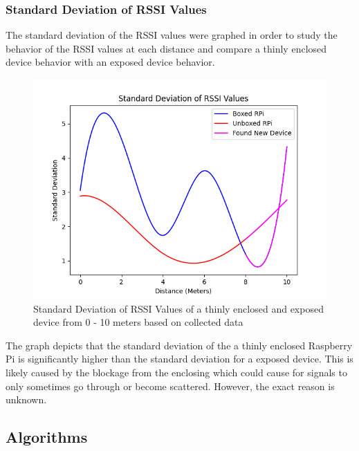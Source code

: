 \documentclass[letterpaper, 10 pt, conference]{ieeeconf}  %
\begin{document}
\subsubsection{Standard Deviation of RSSI Values}
The standard deviation of the RSSI values were graphed in order to study the behavior of the RSSI values at each distance and compare a thinly enclosed device behavior with an exposed device behavior.
   \begin{figure}[thpb]
      \centering
      \includegraphics[scale=0.5]{StandardDeviation.png}
      \caption{Standard Deviation of RSSI Values of a thinly enclosed and exposed device from 0 - 10 meters based on collected data}
      \label{figurelabel}
   \end{figure}
\smallbreak
The graph depicts that the standard deviation of the a thinly enclosed Raspberry Pi is significantly higher than the standard deviation for a exposed device. This is likely caused by the blockage from the enclosing which could cause for signals to only sometimes go through or become scattered. However, the exact reason is unknown. 
\subsection{Algorithms}
\end{document}
